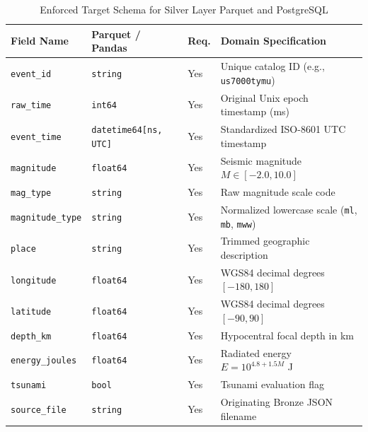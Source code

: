 \begin{table}[!t]
\caption{Enforced Target Schema for Silver Layer Parquet and PostgreSQL}
\label{tab:schema}
\centering
\renewcommand{\arraystretch}{1.12}
\begin{tabularx}{\columnwidth}{p{2.2cm} p{2.3cm} p{1.1cm} X}
\toprule
\textbf{Field Name} & \textbf{Parquet / Pandas} & \textbf{Req.} & \textbf{Domain Specification} \\
\midrule
\texttt{event\_id} & \texttt{string} & Yes & Unique catalog ID (e.g., \texttt{us7000tymu}) \\
\texttt{raw\_time} & \texttt{int64} & Yes & Original Unix epoch timestamp (ms) \\
\texttt{event\_time} & \texttt{datetime64[ns, UTC]} & Yes & Standardized ISO-8601 UTC timestamp \\
\texttt{magnitude} & \texttt{float64} & Yes & Seismic magnitude $M \in [-2.0, 10.0]$ \\
\texttt{mag\_type} & \texttt{string} & Yes & Raw magnitude scale code \\
\texttt{magnitude\_type} & \texttt{string} & Yes & Normalized lowercase scale (\texttt{ml}, \texttt{mb}, \texttt{mww}) \\
\texttt{place} & \texttt{string} & Yes & Trimmed geographic description \\
\texttt{longitude} & \texttt{float64} & Yes & WGS84 decimal degrees $[-180, 180]$ \\
\texttt{latitude} & \texttt{float64} & Yes & WGS84 decimal degrees $[-90, 90]$ \\
\texttt{depth\_km} & \texttt{float64} & Yes & Hypocentral focal depth in km \\
\texttt{energy\_joules} & \texttt{float64} & Yes & Radiated energy $E = 10^{4.8 + 1.5M}$ J \\
\texttt{tsunami} & \texttt{bool} & Yes & Tsunami evaluation flag \\
\texttt{source\_file} & \texttt{string} & Yes & Originating Bronze JSON filename \\
\bottomrule
\end{tabularx}
\end{table}

